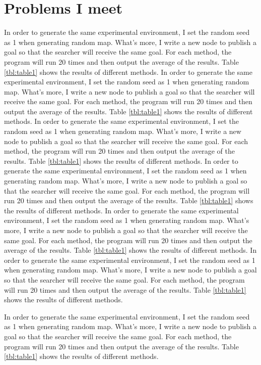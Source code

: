 \documentclass[conference]{IEEEtran}
\begin{document}
\section{Problems I meet}
In order to generate the same experimental environment, I set the random seed as 1 when generating random map. What's more, I write a new node to publish a goal so that the searcher will receive the same goal. For each method, the program will run 20 times and then output the average of the results. Table \ref {tbl:table1} shows the results of different methods. 
In order to generate the same experimental environment, I set the random seed as 1 when generating random map. What's more, I write a new node to publish a goal so that the searcher will receive the same goal. For each method, the program will run 20 times and then output the average of the results. Table \ref {tbl:table1} shows the results of different methods. 
In order to generate the same experimental environment, I set the random seed as 1 when generating random map. What's more, I write a new node to publish a goal so that the searcher will receive the same goal. For each method, the program will run 20 times and then output the average of the results. Table \ref {tbl:table1} shows the results of different methods. 
In order to generate the same experimental environment, I set the random seed as 1 when generating random map. What's more, I write a new node to publish a goal so that the searcher will receive the same goal. For each method, the program will run 20 times and then output the average of the results. Table \ref {tbl:table1} shows the results of different methods. 
In order to generate the same experimental environment, I set the random seed as 1 when generating random map. What's more, I write a new node to publish a goal so that the searcher will receive the same goal. For each method, the program will run 20 times and then output the average of the results. Table \ref {tbl:table1} shows the results of different methods. 
In order to generate the same experimental environment, I set the random seed as 1 when generating random map. What's more, I write a new node to publish a goal so that the searcher will receive the same goal. For each method, the program will run 20 times and then output the average of the results. Table \ref {tbl:table1} shows the results of different methods. 

In order to generate the same experimental environment, I set the random seed as 1 when generating random map. What's more, I write a new node to publish a goal so that the searcher will receive the same goal. For each method, the program will run 20 times and then output the average of the results. Table \ref {tbl:table1} shows the results of different methods. 
%
%
%
\end{document}
